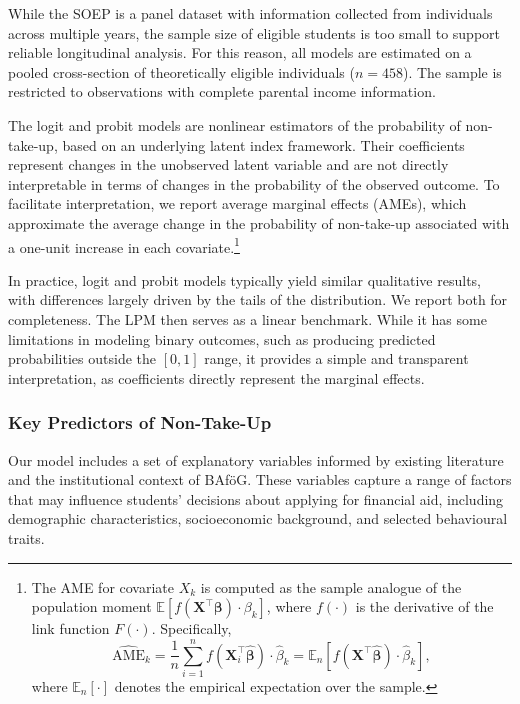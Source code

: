 While the SOEP is a panel dataset with information collected from individuals across multiple years, the sample size of eligible students is too small to support reliable longitudinal analysis. For this reason, all models are estimated on a pooled cross-section of theoretically eligible individuals (\( n = 458 \)). The sample is restricted to observations with complete parental income information.

The logit and probit models are nonlinear estimators of the probability of non-take-up, based on an underlying latent index framework. 
Their coefficients represent changes in the unobserved latent variable and are not directly interpretable in terms of changes in the probability of the observed outcome. 
To facilitate interpretation, we report average marginal effects (AMEs), which approximate the average change in the probability of non-take-up associated with a one-unit increase in each covariate.\footnote{The AME for covariate \( X_k \) is computed as the sample analogue of the population moment \( \mathbb{E}[f(\mathbf{X}^\top \boldsymbol{\beta}) \cdot \beta_k] \), where \( f(\cdot) \) is the derivative of the link function \( F(\cdot) \). Specifically,
\[
    \widehat{\text{AME}}_k 
    = \frac{1}{n} \sum_{i=1}^n f(\mathbf{X}_i^\top \hat{\boldsymbol{\beta}}) \cdot \hat{\beta}_k
    = \mathbb{E}_n \left[ f(\mathbf{X}^\top \hat{\boldsymbol{\beta}}) \cdot \hat{\beta}_k \right],
\]
where \( \mathbb{E}_n[\cdot] \) denotes the empirical expectation over the sample.}

In practice, logit and probit models typically yield similar qualitative results, with differences largely driven by the tails of the distribution. We report both for completeness. The LPM then serves as a linear benchmark. While it has some limitations in modeling binary outcomes, such as producing predicted probabilities outside the \([0,1]\) range, it provides a simple and transparent interpretation, as coefficients directly represent the marginal effects.

\subsubsection{Key Predictors of Non-Take-Up}
Our model includes a set of explanatory variables informed by existing literature and the institutional context of BAföG. 
These variables capture a range of factors that may influence students' decisions about applying for financial aid, including demographic characteristics, socioeconomic background, and selected behavioural traits. 

